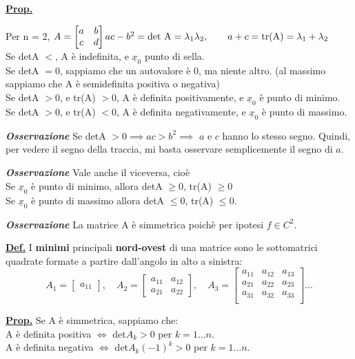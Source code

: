 \documentclass[a4paper,10pt]{article} %
\renewcommand{\b}[1]{%
    {\textbf{#1}}}
\renewcommand{\v}[1]{%
    {\underline{#1}}}
\newcommand{\ldef}[1]{%
    {\smallbreak\par\tiny\textbf{\underline{Def.}} {#1} \smallbreak}}
\newcommand{\lprop}[1]{%
    {\smallbreak\par\tiny\textbf{\underline{Prop.}} {#1} \smallbreak}}
\newcommand{\loss}[1]{%
    {\smallbreak\par\tiny\emph{\textbf{Osservazione}} {#1} \par}}
\begin{document}
\begin{multicols}{6}
\lprop{
    Per n = 2, $ A = \begin{bmatrix} a & b \\ c & d \end{bmatrix} \\
        ac - b^2 = \text{det A} = \lambda_1 \lambda_2, \quad \quad 
        a + c = \text{tr(A)} = \lambda_1 + \lambda_2$ \\
    Se detA $<  $, A è indefinita, e $\v{x}_0$ punto di sella.\\
    Se detA $=0$, sappiamo che un autovalore è 0, ma niente altro. 
    (al massimo sappiamo che A è semidefinita positiva o negativa)\\
    Se detA $>0$, e tr(A) $>0$, A è definita positivamente,
    e $\v{x}_0$ è punto di minimo.\\
    Se detA $>0$, e tr(A) $<0$, A è definita negativamente,
    e $\v{x}_0$ è punto di massimo.

    \loss{
        Se detA $ > 0 \implies ac > b^2 \implies $ $a$ e $c$ hanno lo stesso
        segno.  Quindi, per vedere il segno della traccia, mi basta osservare
        semplicemente il segno di $a$.
    }
    \loss{
        Vale anche il viceversa, cioè\\ 
        Se $\v{x}_0$ è punto di minimo, allora detA $\geq0$, tr(A) $\geq 0$\\ 
        Se $\v{x}_0$ è punto di massimo allora detA $\leq0$, tr(A) $\leq 0$.\\ 
    }
    \loss{
        La matrice A è simmetrica poichè per ipotesi $f \in C^2$.
    }
}

\ldef{
    I \b{minimi} principali \b{nord-ovest} di una matrice sono le sottomatrici
    quadrate formate a partire dall'angolo in alto a sinistra:
    \[
        A_1=\begin{bmatrix} a_{11} \end{bmatrix}, \quad
        A_2=\begin{bmatrix} a_{11}&a_{12}\\a_{21}&a_{22}  \end{bmatrix}, \quad
        A_3=\begin{bmatrix} 
            a_{11} & a_{12} & a_{13} \\
            a_{21} & a_{22} & a_{23} \\
            a_{31} & a_{32} & a_{33} \\
        \end{bmatrix}\dots
    \]
}

\lprop {
    Se A è simmetrica, sappiamo che:\\
    A è definita positiva $\Leftrightarrow$ det$A_k > 0 $ per $k = 1 \dots
    n$.\\ A è definita negativa $ \Leftrightarrow $ det$A_k (-1)^k > 0 $ per
    $k = 1 \dots n$.
}




\end{multicols}
\end{document}
